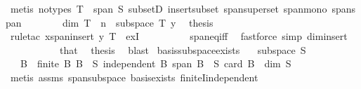 \begin{isabellebody}
\ {\isacharparenleft}{\kern0pt}metis\ {\isacharparenleft}{\kern0pt}no{\isacharunderscore}{\kern0pt}types{\isacharparenright}{\kern0pt}\ {\isacartoucheopen}T\ {\isasymsubseteq}\ span\ S{\isacartoucheclose}\ subsetD\ insert{\isacharunderscore}{\kern0pt}subset\ span{\isacharunderscore}{\kern0pt}superset\ span{\isacharunderscore}{\kern0pt}mono\ span{\isacharunderscore}{\kern0pt}span{\isacharparenright}{\kern0pt}\isanewline
\ \ \ \ \ \ \isamarkupfalse%
\ {\isacartoucheopen}dim\ T\ {\isacharequal}{\kern0pt}\ n{\isacartoucheclose}\ \ {\isacartoucheopen}subspace\ T{\isacartoucheclose}\ y\ \isamarkupfalse%
\ {\isacharquery}{\kern0pt}thesis\isanewline
\ \ \ \ \ \ \ \ \isamarkupfalse%
\ {\isacharparenleft}{\kern0pt}rule{\isacharunderscore}{\kern0pt}tac\ x{\isacharequal}{\kern0pt}{\isachardoublequoteopen}span{\isacharparenleft}{\kern0pt}insert\ y\ T{\isacharparenright}{\kern0pt}{\isachardoublequoteclose}\ \ exI{\isacharparenright}{\kern0pt}\isanewline
\ \ \ \ \ \ \ \ \isamarkupfalse%
\ span{\isacharunderscore}{\kern0pt}eq{\isacharunderscore}{\kern0pt}iff\ \isamarkupfalse%
\ {\isacharparenleft}{\kern0pt}fastforce\ simp{\isacharcolon}{\kern0pt}\ dim{\isacharunderscore}{\kern0pt}insert{\isacharparenright}{\kern0pt}\isanewline
\ \ \ \ \isamarkupfalse%
\isanewline
\ \ \isamarkupfalse%
\isanewline
\ \ \isamarkupfalse%
\ that\ \isamarkupfalse%
\ {\isacharquery}{\kern0pt}thesis\ \isamarkupfalse%
\ blast\isanewline
{}\isamarkupfalse%
%
\endisatagproof
{\isafoldproof}%
%
\isadelimproof
\isanewline
%
\endisadelimproof
\isanewline
{}\isamarkupfalse%
\ basis{\isacharunderscore}{\kern0pt}subspace{\isacharunderscore}{\kern0pt}exists{\isacharcolon}{\kern0pt}\isanewline
\ \ \ {\isachardoublequoteopen}subspace\ S{\isachardoublequoteclose}\isanewline
\ \ \ B\ \ {\isachardoublequoteopen}finite\ B{\isachardoublequoteclose}\ {\isachardoublequoteopen}B\ {\isasymsubseteq}\ S{\isachardoublequoteclose}\ {\isachardoublequoteopen}independent\ B{\isachardoublequoteclose}\ {\isachardoublequoteopen}span\ B\ {\isacharequal}{\kern0pt}\ S{\isachardoublequoteclose}\ {\isachardoublequoteopen}card\ B\ {\isacharequal}{\kern0pt}\ dim\ S{\isachardoublequoteclose}\isanewline
%
\isadelimproof
\ \ %
\endisadelimproof
%
\isatagproof
{}\isamarkupfalse%
\ {\isacharparenleft}{\kern0pt}metis\ assms\ span{\isacharunderscore}{\kern0pt}subspace\ basis{\isacharunderscore}{\kern0pt}exists\ finiteI{\isacharunderscore}{\kern0pt}independent{\isacharparenright}{\kern0pt}%

\end{isabellebody}
